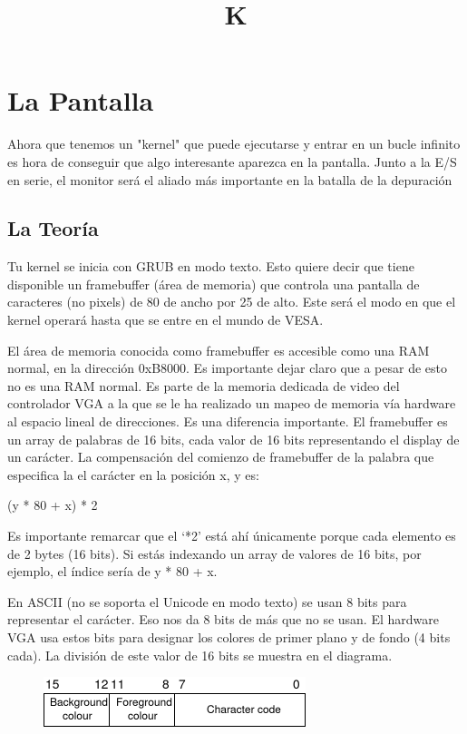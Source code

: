 \documentclass{report}
\begin{document}
\title{K}
\maketitle

\chapter{La Pantalla}

Ahora que tenemos un "kernel" que puede ejecutarse y entrar en un bucle infinito es hora de conseguir que algo interesante aparezca en la pantalla. Junto a la E/S en serie, el monitor ser\'a el aliado m\'as importante en la batalla de la depuraci\'on

\section{La Teor\'ia}

Tu kernel se inicia con GRUB en modo texto. Esto quiere decir que tiene disponible un framebuffer (\'area de memoria) que controla una pantalla de caracteres (no pixels) de 80 de ancho por 25 de alto. Este ser\'a el modo en que el kernel operar\'a hasta que se entre en el mundo de VESA.

El \'area de memoria conocida como framebuffer es accesible como una RAM normal, en la direcci\'on 0xB8000. Es importante dejar claro que a pesar de esto no es una RAM normal. Es parte de la memoria dedicada de video del controlador VGA a la que se le ha realizado un mapeo de memoria v\'ia hardware al espacio lineal de direcciones. Es una diferencia importante.
El framebuffer es un array de palabras de 16 bits, cada valor de 16 bits representando el display de un car\'acter. La compensaci\'on del comienzo de framebuffer de la palabra que especifica la el car\'acter en la posici\'on x, y es:

(y * 80 + x) * 2

Es importante remarcar que el ‘*2’ est\'a ah\'i \'unicamente porque cada elemento es de 2 bytes (16 bits). Si est\'as indexando un array de valores de 16 bits, por ejemplo, el \'indice ser\'ia de y * 80 + x.

En ASCII (no se soporta el Unicode en modo texto) se usan 8 bits para representar el car\'{a}cter. Eso nos da 8 bits de m\'as que no se usan. El hardware VGA usa estos bits para designar los colores de primer plano y de fondo (4 bits cada). La divisi\'on de este valor de 16 bits se muestra en el diagrama.

\begin{figure}[htb]
\centering
\includegraphics[scale=0.5]{word_format.png}
\end{figure}
\end{document}
